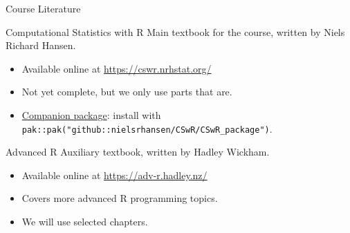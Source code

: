\documentclass[
  ignorenonframetext,
  aspectratio=1610,
  onlytextwidth]{beamer}
\providecommand{\tightlist}{}
\begin{document}
\begin{frame}[fragile]{Course Literature}
\label{course-literature}
\begin{block}{Computational Statistics with R}
\label{computational-statistics-with-r}
Main textbook for the course, written by Niels Richard Hansen.

\begin{itemize}[<+->]
\tightlist
\item
  Available online at \url{https://cswr.nrhstat.org/}
\item
  Not yet complete, but we only use parts that are.
\item
  \href{https://github.com/nielsrhansen/CSwR/tree/master/CSwR_package}{Companion
  package}: install with
  \texttt{pak::pak("github::nielsrhansen/CSwR/CSwR\_package")}.
\end{itemize}

\pause
\end{block}

\begin{block}{Advanced R}
\label{advanced-r}
Auxiliary textbook, written by Hadley Wickham.

\begin{itemize}[<+->]
\tightlist
\item
  Available online at \url{https://adv-r.hadley.nz/}
\item
  Covers more advanced R programming topics.
\item
  We will use selected chapters.
\end{itemize}
\end{block}
\end{frame}
\end{document}
